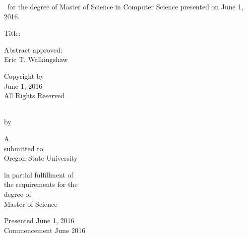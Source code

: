 
\newcommand{\emptyline}{\mbox{}\newline}
\newcommand{\flyleaf}{\thispagestyle{empty}\mbox{}\newpage}

\newcommand{\defensedate}{June 1, 2016}
\makeatletter
\newcommand{\mytitle}{\@title}
\newcommand{\myname}{\@author}
\makeatother

\frontmatter
\pagestyle{empty}
\flyleaf

\begin{center}
\end{center}

\emptyline
\noindent
\myname\ for the degree of Master of Science in Computer Science presented on \defensedate.

\emptyline
\noindent
Title: \mytitle

\emptyline
\noindent
Abstract approved: \hrulefill \\
\phantom{Abstract approved:\ }\hfill Eric T. Walkingshaw


\clearpage

\vspace*{7\baselineskip}
\begin{center}
  \raisebox{2pt}{\textcopyright} Copyright by \myname \\
  \defensedate \\
  All Rights Reserved
\end{center}
\clearpage

\begin{center}
  {\headfont\mytitle} \\ \emptyline
  by \\ \emptyline
  \myname

  \vfill
  A  \\ \emptyline
  submitted to \\ \emptyline
  Oregon State University

  \vfill
  in partial fulfillment of \\
  the requirements for the \\
  degree of \\ \emptyline
  Master of Science

  \vfill
  Presented \defensedate \\
  Commencement June 2016
\end{center}
\clearpage

\newcommand{\Approve}[1]{\vspace{3em}\hrulefill \\ #1}

